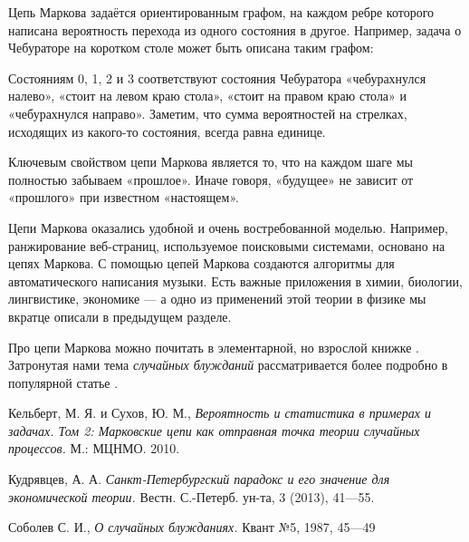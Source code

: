 \documentclass{article}
\begin{document}
Цепь Маркова задаётся ориентированным графом, 
на каждом ребре которого написана вероятность перехода из одного состояния в другое.
Например, задача о Чебураторе на коротком столе может быть описана таким графом:
\begin{center}
\end{center}
Состояниям 0, 1, 2 и 3 соответствуют состояния Чебуратора «чебурахнулся налево», «стоит на левом краю стола», «стоит на правом краю стола» и «чебурахнулся направо».
Заметим, что сумма вероятностей на стрелках, исходящих из какого-то состояния, всегда равна единице.

Ключевым свойством цепи Маркова является то, что на каждом шаге
мы полностью забываем «прошлое».
Иначе говоря, «будущее» не зависит от «прошлого» при известном «настоящем».

Цепи Маркова оказались удобной и очень востребованной моделью.
Например, ранжирование веб-страниц, используемое поисковыми системами, основано на цепях Маркова.
С помощью цепей Маркова создаются алгоритмы для автоматического написания музыки.
Есть важные приложения в химии, биологии, лингвистике, экономике --- а одно из применений этой теории в физике мы вкратце описали в предыдущем разделе.

Про цепи Маркова можно почитать в элементарной, но взрослой книжке \cite{kemeny}.
Затронутая нами тема \emph{случайных блужданий} рассматривается более подробно в популярной статье \cite{sobolev}.

\begin{thebibliography}{52}
Кельберт, М. Я. и Сухов, Ю. М., 
\emph{Вероятность и статистика в примерах и задачах. Том 2: 
Марковские цепи как отправная точка теории случайных процессов.} 
М.: МЦНМО. 2010.

Кудрявцев, А. А. 
\emph{Санкт-Петербургский парадокс и его значение для экономической теории.} 
Вестн. С.-Петерб. ун-та, 3 (2013), 41---55.

Соболев С. И., 
\emph{О случайных блужданиях.} 
Квант №5, 1987, 45---49

\end{thebibliography}
\end{document}
